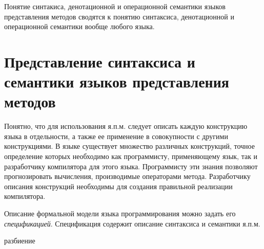 Понятие синтакиса, денотационной и операционной семантики языков представления методов сводятся к понятию синтаксиса, денотационной и операционной семантики вообще любого языка.

\section{Представление синтаксиса и семантики языков представления методов}

Понятно, что для использования я.п.м. следует описать каждую конструкцию языка в отдельности, а также ее применение в совокупности с другими конструкциями. В языке существует множество различных конструкций, точное определение которых необходимо как программисту, применяющему язык, так и разработчику компилятора для этого языка. Программисту эти знания позволяют прогнозировать вычисления, производимые операторами метода. Разработчику описания конструкций необходимы для создания правильной реализации компилятора.

Описание формальной модели языка программирования можно задать его \textit{спецификацией}. Спецификация содержит описание синтаксиса и семантики я.п.м.

\begin{SCn}
\begin{scnrelfromset}{разбиение}
    \begin{scnindent}
    \end{scnindent}
    \begin{scnindent}
    \end{scnindent}
    \begin{scnindent}
    \end{scnindent}
\end{scnrelfromset}
\end{SCn}

